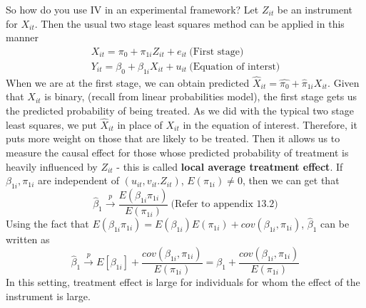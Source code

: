 \documentclass[12pt]{article}
\theoremstyle{definition}
\theoremstyle{property}
\theoremstyle{assumption}
\theoremstyle{example}
\theoremstyle{comment}
\begin{document}
So how do you use IV in an experimental framework? Let $Z_{it}$ be an instrument for $X_{it}$. Then the usual two stage least squares method can be applied in this manner
\begin{gather*}
X_{it} = \pi_0+\pi_{1i}Z_{it}+e_{it} \ \text{(First stage)}\\
Y_{it} = \beta_0+\beta_{1i}X_{it}+u_{it} \ \text{(Equation of interst)}
\end{gather*}
When we are at the first stage, we can obtain predicted $\hat{X}_{it}=\hat{\pi_0}+\hat{\pi}_{1i}X_{it}$. Given that $X_{it}$ is binary, (recall from linear probabilities model), the first stage gets us the predicted probability of being treated. As we did with the typical two stage least squares, we put $\hat{X}_{it}$ in place of $X_{it}$ in the equation of interest. Therefore, it puts more weight on those that are likely to be treated. Then it allows us to measure the causal effect for those whose predicted probability of treatment is heavily influenced by $Z_{it}$ - this is called \textbf{local average treatment effect}. If $\beta_{1i}, \pi_{1i}$ are independent of $(u_{it},v_{it}.Z_{it})$, $E(\pi_{1i})\neq0$, then we can get that
\[
\hat{\beta}_{1}\xrightarrow{p}\frac{E(\beta_{1i}\pi_{1i})}{E(\pi_{1i})} \ \text{(Refer to appendix 13.2)}
\]
Using the fact that $E(\beta_{1i}\pi_{1i})=E(\beta_{1i})E(\pi_{1i})+cov(\beta_{1i},\pi_{1i})$, $\hat{\beta}_1$ can be written as 
\[
\hat{\beta}_{1}\xrightarrow{p} E[\beta_{1i}]+\frac{cov(\beta_{1i},\pi_{1i})}{E(\pi_{1i})} = \beta_1+\frac{cov(\beta_{1i},\pi_{1i})}{E(\pi_{1i})}
\]
In this setting, treatment effect is large for individuals for whom the effect of the instrument is large.
\par\medskip
\end{document}
